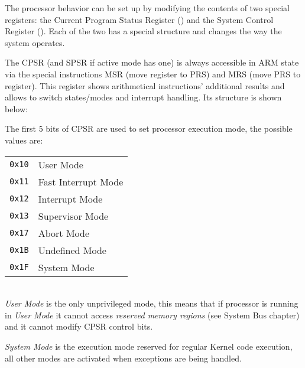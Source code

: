 
The processor behavior can be set up by modifying the contents of two special registers: the Current Program Status Register () and the System Control Register ().
Each of the two has a special structure and changes the way the system operates.


The CPSR (and SPSR if active mode has one) is always accessible in ARM state via the special instructions MSR (move register to PRS) and MRS (move PRS to register). This register shows arithmetical instructions' additional results and allows to switch states/modes and interrupt handling. Its structure is shown below:

\vspace{5px}
\begin{adjustbox}{center}

\end{adjustbox}
\vspace{5px}



The first 5 bits of CPSR are used to set processor execution mode, the possible values are:
\\

\begin{tabular}{r|l}
\texttt{0x10} & User Mode \\
\texttt{0x11} & Fast Interrupt Mode \\
\texttt{0x12} & Interrupt Mode \\
\texttt{0x13} & Supervisor Mode \\
\texttt{0x17} & Abort Mode \\
\texttt{0x1B} & Undefined Mode \\
\texttt{0x1F} & System Mode \\
\end{tabular}
\\

\emph{User Mode} is the only unprivileged mode, this means that if processor is running in \emph{User Mode} it cannot access \emph{reserved memory regions} (see System Bus chapter) and it cannot modify CPSR control bits.

\emph{System Mode} is the execution mode reserved for regular Kernel code execution, all other modes are activated when exceptions are being handled.

\label{sec:manual:systemControlRegister}

